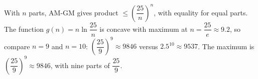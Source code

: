With $n$ parts, AM-GM gives product $\le\left(\dfrac{25}n\right)^n$, with equality for equal parts. The function $g(n)=n\ln\dfrac{25}n$ is concave with maximum at $n=\dfrac{25}e\approx9.2$, so compare $n=9$ and $n=10$: $\left(\dfrac{25}9\right)^9\approx9846$ versus $2.5^{10}\approx9537$. The maximum is $\boxed{\left(\dfrac{25}9\right)^9}\approx9846$, with nine parts of $\dfrac{25}9$.
